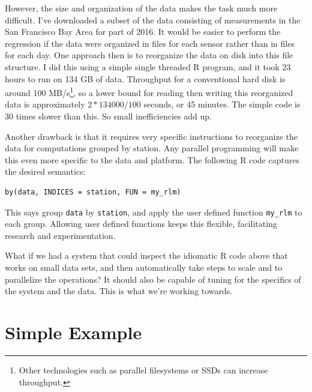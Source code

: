\documentclass[12pt]{article}
\begin{document}
However, the size and organization of the data makes the task much more
difficult.  I've downloaded a subset of the data consisting of measurements
in the San Francisco Bay Area for part of 2016.  It would be easier to
perform the regression if the data were organized in files for each sensor
rather than in files for each day.  One approach then is to reorganize the
data on disk into this file structure. I did this using a simple single
threaded R program, and it took 23 hours to run on 134 GB of data.
Throughput for a conventional hard disk is around 100
MB/s\footnote{Other technologies such as parallel filesystems or SSDs can increase throughput.}, so a lower
bound for reading then writing this reorganized data is approximately $2 *
134000 / 100$ seconds, or 45 minutes. The simple code is 30 times slower
than this. So small inefficiencies add up.

Another drawback is that it requires very specific instructions to
reorganize the data for computations grouped by station. Any parallel
programming will make this even more specific to the data and platform. The
following R code captures the desired semantics:

\begin{verbatim}
by(data, INDICES = station, FUN = my_rlm)
\end{verbatim}

This says group \texttt{data} by \texttt{station}, and apply the
user defined function \texttt{my\_rlm} to each group. Allowing user defined
functions keeps this flexible, facilitating research and experimentation.

What if we had a system that could inspect the idiomatic R code above that
works on small data sets, and then automatically take steps to scale and to
parallelize the operations? It should also be capable of tuning for the
specifics of the system and the data. This is what we're working towards.

\section{Simple Example}

\end{document}
